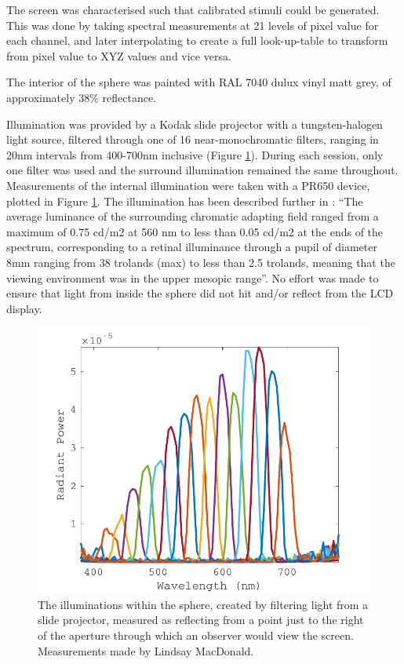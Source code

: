 The screen was characterised such that calibrated stimuli could be generated. This was done by taking spectral measurements at 21 levels of pixel value for each channel, and later interpolating to create a full look-up-table to transform from pixel value to XYZ values and vice versa.

The interior of the sphere was painted with RAL 7040 dulux vinyl matt grey, of approximately 38\% reflectance. 

Illumination was provided by a Kodak slide projector with a tungsten-halogen light source, filtered through one of 16 near-monochromatic filters, ranging in 20nm intervals from 400-700nm inclusive (Figure \ref{fig:LSillum}). During each session, only one filter was used and the surround illumination remained the same throughout. Measurements of the internal illumination were taken with a \gls{PR650} device, plotted in Figure \ref{fig:LSillum}. The illumination has been described further in \citet{macdonald_chromatic_2013}: ``The average luminance of the surrounding chromatic adapting field ranged from a maximum of 0.75 cd/m2 at 560 nm to less than 0.05 cd/m2 at the ends of the spectrum, corresponding to a retinal illuminance through a pupil of diameter 8mm ranging from 38 trolands (max) to less than 2.5 trolands, meaning that the viewing environment was in the upper mesopic range''. No effort was made to ensure that light from inside the sphere did not hit and/or reflect from the LCD display. 

\begin{figure}[htbp]
\includegraphics[max width=\textwidth]{figs/LargeSphere/LSillum.pdf}
\caption{The illuminations within the sphere, created by filtering light from a slide projector, measured as reflecting from a point just to the right of the aperture through which an observer would view the screen. Measurements made by Lindsay MacDonald.}
\label{fig:LSillum}
\end{figure}

